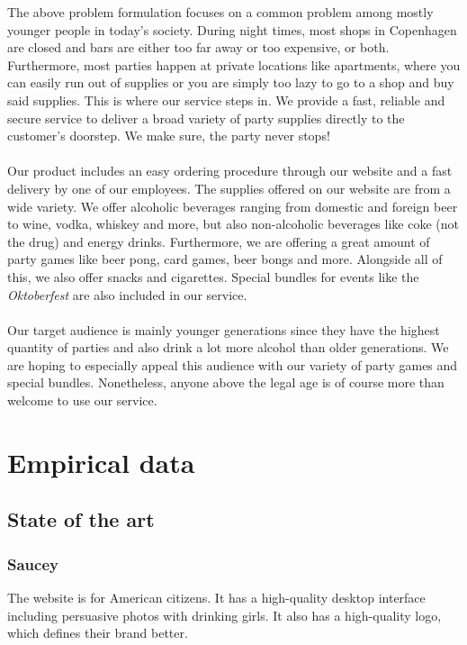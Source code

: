 \documentclass[12p]{article}
\begin{document}
The above problem formulation focuses on a common problem among mostly younger people in today's society. During night times, most shops in Copenhagen are closed and bars are either too far away or too expensive, or both. Furthermore, most parties happen at private locations like apartments, where you can easily run out of supplies or you are simply too lazy to go to a shop and buy said supplies. This is where our service steps in. We provide a fast, reliable and secure service to deliver a broad variety of party supplies directly to the customer's doorstep. We make sure, the party never stops! 
\\ \\
Our product includes an easy ordering procedure through our website and a fast delivery by one of our employees. The supplies offered on our website are from a wide variety. We offer alcoholic beverages ranging from domestic and foreign beer to wine, vodka, whiskey and more, but also non-alcoholic beverages like coke (not the drug) and energy drinks. Furthermore, we are offering a great amount of party games like beer pong, card games, beer bongs and more. Alongside all of this, we also offer snacks and cigarettes. Special bundles for events like the \emph{Oktoberfest} are also included in our service.
\\ \\
Our target audience is mainly younger generations since they have the highest quantity of parties and also drink a lot more alcohol than older generations. We are hoping to especially appeal this audience with our variety of party games and special bundles. Nonetheless, anyone above the legal age is of course more than welcome to use our service.


\newpage
\section{Empirical data}


\subsection{State of the art}

\subsubsection{Saucey \cite{Saucey}}
The website is for American citizens. It has a high-quality desktop interface including persuasive photos with drinking girls. It also has a high-quality logo, which defines their brand better.
\end{document}
